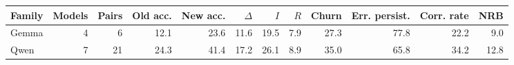 \begin{tabular}{lrrrrrrrrrrr}
\toprule
Family & Models & Pairs & Old acc. & New acc. & $\Delta$ & $I$ & $R$ & Churn & Err. persist. & Corr. rate & NRB \\
\midrule
Gemma & 4 & 6 & 12.1 & 23.6 & 11.6 & 19.5 & 7.9 & 27.3 & 77.8 & 22.2 & 9.0 \\
Qwen & 7 & 21 & 24.3 & 41.4 & 17.2 & 26.1 & 8.9 & 35.0 & 65.8 & 34.2 & 12.8 \\
\bottomrule
\end{tabular}
